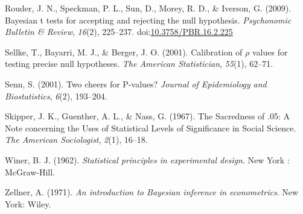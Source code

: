 \documentclass[,jou,floatsintext]{apa6}
\begin{document}
\leavevmode\hypertarget{ref-rouder_bayesian_2009}{}%
Rouder, J. N., Speckman, P. L., Sun, D., Morey, R. D., \& Iverson, G. (2009). Bayesian t tests for accepting and rejecting the null hypothesis. \emph{Psychonomic Bulletin \& Review}, \emph{16}(2), 225--237. doi:\href{https://doi.org/10.3758/PBR.16.2.225}{10.3758/PBR.16.2.225}

\leavevmode\hypertarget{ref-sellke_calibration_2001}{}%
Sellke, T., Bayarri, M. J., \& Berger, J. O. (2001). Calibration of \(\rho\) values for testing precise null hypotheses. \emph{The American Statistician}, \emph{55}(1), 62--71.

\leavevmode\hypertarget{ref-senn_two_2001}{}%
Senn, S. (2001). Two cheers for P-values? \emph{Journal of Epidemiology and Biostatistics}, \emph{6}(2), 193--204.

\leavevmode\hypertarget{ref-skipper_sacredness_1967}{}%
Skipper, J. K., Guenther, A. L., \& Nass, G. (1967). The Sacredness of .05: A Note concerning the Uses of Statistical Levels of Significance in Social Science. \emph{The American Sociologist}, \emph{2}(1), 16--18.

\leavevmode\hypertarget{ref-winer_statistical_1962}{}%
Winer, B. J. (1962). \emph{Statistical principles in experimental design}. New York : McGraw-Hill.

\leavevmode\hypertarget{ref-zellner_introduction_1971}{}%
Zellner, A. (1971). \emph{An introduction to Bayesian inference in econometrics}. New York: Wiley.
\end{document}
